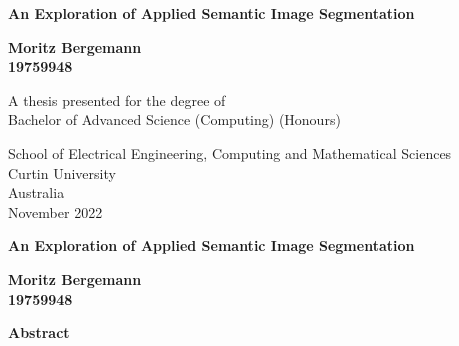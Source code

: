 \documentclass[a4paper,12pt]{report}
\begin{document}
{}
\begin{titlepage}
    \begin{center}
        \vspace*{0.5cm}
            
        \LARGE
        \textbf{An Exploration of Applied Semantic Image Segmentation}
            
            
        \vspace{1.0cm}
        \Large
            
        \textbf{Moritz Bergemann\\ 19759948}
            
        \vfill
            
        A thesis presented for the degree of\\
        Bachelor of Advanced Science (Computing) (Honours)
            
        \vspace{2.5cm}
            
            
        \large
        School of Electrical Engineering, Computing and Mathematical Sciences\\
        Curtin University\\
        Australia\\
        November 2022
            
    \end{center}
\end{titlepage}

\thispagestyle{plain}
\begin{center}
    \Large
    \textbf{An Exploration of Applied Semantic Image Segmentation}
        
    \vspace{0.4cm}
    \large
        
    \vspace{0.4cm}
    \textbf{Moritz Bergemann\\ 19759948}
       
    \vspace{0.9cm}
    \textbf{Abstract}
\end{center}
\end{document}
